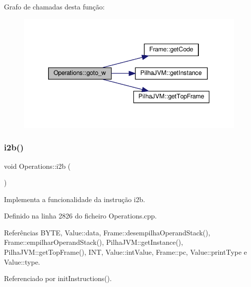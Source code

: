 Grafo de chamadas desta função\+:\nopagebreak
\begin{figure}[H]
\begin{center}
\leavevmode
\includegraphics[width=339pt]{classOperations_aed8436ead5dfcaef69b24e1b2fff7744_cgraph}
\end{center}
\end{figure}
\mbox{\label{classOperations_adfe0344bae5a1252330b7324e827ed35}} 
\subsubsection{\texorpdfstring{i2b()}{i2b()}}
{\footnotesize\ttfamily void Operations\+::i2b (\begin{DoxyParamCaption}{ }\end{DoxyParamCaption})\hspace{0.3cm}{\ttfamily [private]}}



Implementa a funcionalidade da instrução i2b. 



Definido na linha 2826 do ficheiro Operations.\+cpp.



Referências B\+Y\+TE, Value\+::data, Frame\+::desempilha\+Operand\+Stack(), Frame\+::empilhar\+Operand\+Stack(), Pilha\+J\+V\+M\+::get\+Instance(), Pilha\+J\+V\+M\+::get\+Top\+Frame(), I\+NT, Value\+::int\+Value, Frame\+::pc, Value\+::print\+Type e Value\+::type.



Referenciado por init\+Instructions().

